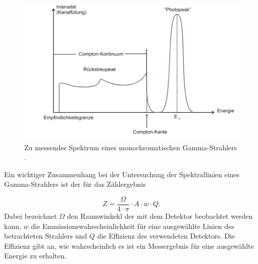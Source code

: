 \FloatBarrier
\begin{figure}
  \includegraphics[width=\textwidth]{content/skizzen/idspektrum.png}
  \caption{Zu messendes Spektrum eines monochromatischen Gamma-Strahlers \cite{sample}.}
  \label{fig:idealspektrum}
\end{figure}
\FloatBarrier
Ein wichtiger Zusammenhang bei der Untersuchung der Spektrallinien eines Gamma-Strahlers ist der für
das Zählergebnis

\begin{equation}
  \label{eqn:effizienz}
  Z = \frac{\Omega}{4\cdot \pi} \cdot A \cdot w \cdot Q .
\end{equation}
Dabei bezeichnet $\Omega$ den Raumwinkekl der mit dem Detektor beobachtet werden kann, $w$ die
Emmissionswahrscheinlichkeit für eine ausgewählte Linien des betrachteten Strahlers und $Q$ die
Effizienz des verwendeten Detektors. Die Effizienz gibt an, wie wahrscheinlich es ist ein Messergebnis für eine ausgewählte
Energie zu erhalten.

\cite{sample}